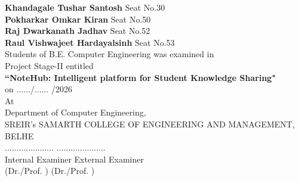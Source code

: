 \documentclass[12,Times new Roman,a4paper]{report}
\begin{document}
\begin{titlepage}
\begin{center}
\textbf{Khandagale Tushar Santosh}  \hspace{2.5cm} Seat No.30  \\
\textbf{Pokharkar Omkar Kiran}  \hspace{2.9 cm} Seat No.50  \\
\textbf{Raj Dwarkanath Jadhav}\hspace{3.1 cm} Seat No.52 \\
\textbf{Raul Vishwajeet Hardayalsinh} \hspace{2.1 cm} Seat No.53  \\[0.3cm]
		\vspace{0.2in}
		{\small Students of B.E. Computer Engineering  was examined in}\\
		{\small Project Stage-II entitled}\\
		\vspace{0.3in}
		{\Large \bf {``NoteHub: Intelligent platform for Student Knowledge Sharing" }}\\ 
		\vspace{0.2in}
		\vspace{0.1in}
		{on $\ldots$$\ldots$/$\ldots$$\ldots$ /2026}\\
		\vspace{0.1in}
		{At}\\
		{ Department of Computer Engineering,}\\
		{ SREIR’s SAMARTH COLLEGE OF ENGINEERING AND MANAGEMENT,}\\
		{BELHE}\\
		\vspace{0.6in}
		\noindent
		\hspace*{0.3in}$\ldots\ldots\ldots\ldots\ldots\ldots\ldots $\hspace{1.9in} $\ldots\ldots\ldots\ldots\ldots\ldots\ldots $\\
		\hspace*{0.3in} Internal Examiner \hspace*{2.2in} External Examiner\\
		\hspace*{0.5in}(Dr./Prof. \hspace*{0.9in} ) \hspace*{2.1in}(Dr./Prof. \hspace*{0.9in} )\\
		\vspace{0.3in}
		\end{center}
		
	\end{titlepage}
\end{document}
